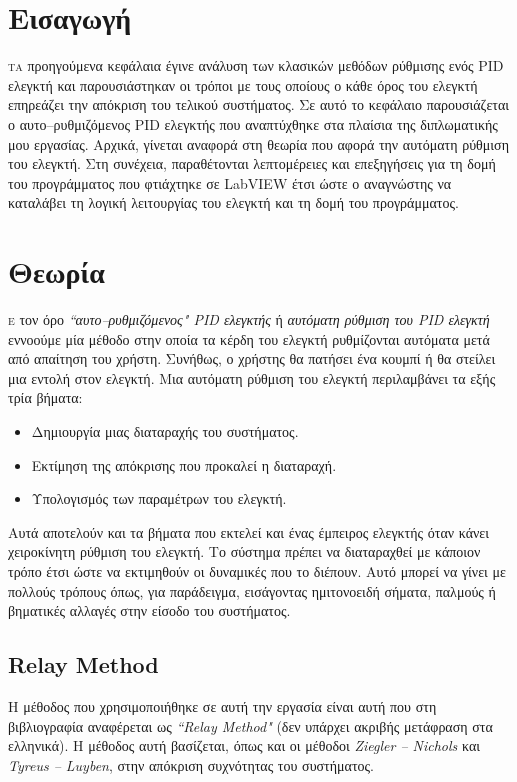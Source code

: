 


\section{Εισαγωγή}

\lettrine[findent=2pt]{}{τα} προηγούμενα κεφάλαια έγινε ανάλυση των κλασικών μεθόδων ρύθμισης ενός PID ελεγκτή και παρουσιάστηκαν οι τρόποι με τους οποίους ο κάθε όρος του ελεγκτή επηρεάζει την απόκριση του τελικού συστήματος. Σε αυτό το κεφάλαιο παρουσιάζεται ο αυτο--ρυθμιζόμενος PID ελεγκτής που αναπτύχθηκε στα πλαίσια της διπλωματικής μου εργασίας. Αρχικά, γίνεται αναφορά στη θεωρία που αφορά την αυτόματη ρύθμιση του ελεγκτή. Στη συνέχεια, παραθέτονται λεπτομέρειες και επεξηγήσεις για τη δομή του προγράμματος που φτιάχτηκε σε LabVIEW έτσι ώστε ο αναγνώστης να καταλάβει τη λογική λειτουργίας του ελεγκτή και τη δομή του προγράμματος.

\section{Θεωρία}

\lettrine[findent=2pt]{}{ε} τον όρο \emph{``αυτο--ρυθμιζόμενος" PID ελεγκτής} ή \emph{αυτόματη ρύθμιση του PID ελεγκτή} εννοούμε μία μέθοδο στην οποία τα κέρδη του ελεγκτή ρυθμίζονται αυτόματα μετά από απαίτηση του χρήστη. Συνήθως, ο χρήστης θα πατήσει ένα κουμπί ή θα στείλει μια εντολή στον ελεγκτή. Μια αυτόματη ρύθμιση του ελεγκτή περιλαμβάνει τα εξής τρία βήματα:

\begin{itemize}
	\item Δημιουργία μιας διαταραχής του συστήματος.
	\item Εκτίμηση της απόκρισης που προκαλεί η διαταραχή.
	\item Υπολογισμός των παραμέτρων του ελεγκτή.
\end{itemize}
Αυτά αποτελούν και τα βήματα που εκτελεί και ένας έμπειρος ελεγκτής όταν κάνει χειροκίνητη ρύθμιση του ελεγκτή. Το σύστημα πρέπει να διαταραχθεί με κάποιον τρόπο έτσι ώστε να εκτιμηθούν οι δυναμικές που το διέπουν. Αυτό μπορεί να γίνει με πολλούς τρόπους όπως, για παράδειγμα, εισάγοντας ημιτονοειδή σήματα, παλμούς ή βηματικές αλλαγές στην είσοδο του συστήματος.

\subsection{Relay Method}
Η μέθοδος που χρησιμοποιήθηκε σε αυτή την εργασία είναι αυτή που στη βιβλιογραφία αναφέρεται ως \emph{``Relay Method"} (δεν υπάρχει ακριβής μετάφραση στα ελληνικά).
Η μέθοδος αυτή βασίζεται, όπως και οι μέθοδοι \emph{Ziegler -- Nichols} και \emph{Tyreus -- Luyben}, στην απόκριση συχνότητας του συστήματος.

